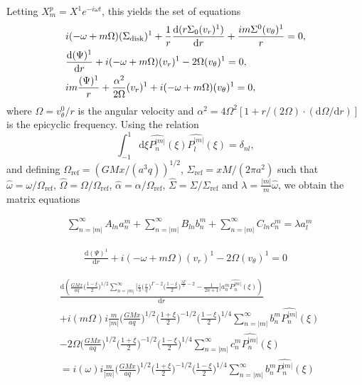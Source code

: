 \documentclass[11pt]{article}
\newcommand{\rd}{\mathrm{d}}
\newcommand{\vr}{v_{r}}
\newcommand{\vt}{v_{\theta}}
\newcommand{\Sigmad}{\Sigma_{\rm{disk}}}
\newcommand{\anm}{a_n^m}
\newcommand{\bnm}{b_n^m}
\newcommand{\cnm}{c_n^m}
\newcommand{\alm}{a_l^m}
\newcommand{\Pnm}{P_n^{|m|}}
\newcommand{\Plm}{P_l^{|m|}}
\newcommand{\hPnm}{\widehat{\Pnm}}
\newcommand{\hPlm}{\widehat{\Plm}}
\newcommand{\homega}{\widehat{\omega}}
\newcommand{\hOmega}{\widehat{\Omega}}
\newcommand{\Omegaref}{\Omega_{\mathrm{ref}}}
\newcommand{\halpha}{\widehat{\alpha}}
\newcommand{\Sigmaref}{\Sigma_{\mathrm{ref}}}
\newcommand{\hSigma}{\widehat{\Sigma}}
\begin{document}
Letting $X_m^p = X^1  e^{-i \omega t}$, this yields the set of equations
\begin{align}
&i(-\omega + m \Omega)(\Sigmad)^1 + \frac{1}{r} \frac{\rd (r\Sigma_0 (\vr)^1)}{\rd r} + \frac{im\Sigma^0 (\vt)^1}{r} = 0,\\
&\frac{\rd (\Psi)^1}{\rd r} + i(-\omega + m \Omega)(\vr)^1 - 2 \Omega (\vt)^1 = 0,\\
&i m \frac{(\Psi)^1}{r} + \frac{\alpha^2}{2\Omega} (\vr)^1 + i(-\omega + m \Omega)(\vt)^1 = 0,
\end{align}
where $\Omega = \vt^0/r$ is the angular velocity and $\alpha^2=4\Omega^2[1+r/(2\Omega)\cdot(\rd \Omega /\rd r)]$ is the epicyclic frequency. Using the relation 
$$\int_{-1}^{1} \rd \xi \hPnm(\xi)\hPlm(\xi) = \delta_{nl},$$
and defining $\Omegaref=(GMx/(a^3 q))^{1/2}$, $\Sigmaref=xM/(2\pi a^2)$   such that $\homega = \omega/\Omegaref$, $\hOmega = \Omega/\Omegaref$, $\halpha = \alpha/\Omegaref$, $\hSigma=\Sigma/\Sigmaref$ and $\lambda=\frac{|m|}{m}\homega$, we obtain the matrix equations

\begin{align*}
&\sum_{n=|m|}^{\infty}  A_{ln} \anm  +\sum_{n=|m|}^{\infty}  B_{ln}\bnm+\sum_{n=|m|}^{\infty}  C_{ln}\cnm= \lambda \alm  \end{align*}

\begin{align*}
\frac{\rd (\Psi)^1}{\rd r} + i(-\omega + m \Omega)(\vr)^1 - 2 \Omega (\vt)^1 = 0
\end{align*}

\begin{align*}
&\frac{\rd (\frac{GMx}{a q } \bigg(\frac{1-\xi}{2}\bigg)^{1/2}\sum_{n=|m|}^{\infty} \bigg[\frac{\varepsilon}{3}  \bigg(\frac{x}{q}\bigg)^{\Gamma-2} \bigg(\frac{1-\xi}{2}\bigg)^{\frac{3\Gamma}{2}-2}  -\frac{1}{2n+1}  \bigg]\anm \hPnm(\xi))}{\rd r} \\
&+ i( m \Omega)i \frac{m}{|m|} \bigg(\frac{GMx}{aq}\bigg)^{1/2} \bigg(\frac{1+\xi}{2}\bigg)^{-1/2} \bigg(\frac{1-\xi}{2}\bigg)^{1/4} \sum_{n=|m|}^{\infty} \bnm \hPnm(\xi)  \\
&- 2 \Omega \bigg(\frac{GMx}{aq}\bigg)^{1/2} \bigg(\frac{1+\xi}{2}\bigg)^{-1/2} \bigg(\frac{1-\xi}{2}\bigg)^{1/4} \sum_{n=|m|}^{\infty} \cnm \hPnm(\xi) \\
&= i(\omega )i \frac{m}{|m|} \bigg(\frac{GMx}{aq}\bigg)^{1/2} \bigg(\frac{1+\xi}{2}\bigg)^{-1/2} \bigg(\frac{1-\xi}{2}\bigg)^{1/4} \sum_{n=|m|}^{\infty} \bnm \hPnm(\xi) 
\end{align*}
\end{document}
